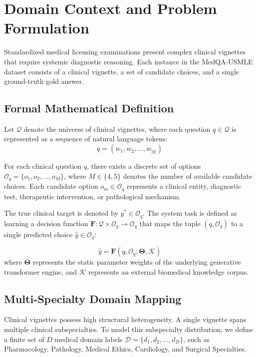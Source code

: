\section{Domain Context and Problem Formulation}
\label{sec:problem_formulation}

Standardized medical licensing examinations present complex clinical vignettes that require systemic diagnostic reasoning. Each instance in the MedQA-USMLE dataset consists of a clinical vignette, a set of candidate choices, and a single ground-truth gold answer.

\subsection{Formal Mathematical Definition}

Let $\mathcal{Q}$ denote the universe of clinical vignettes, where each question $q \in \mathcal{Q}$ is represented as a sequence of natural language tokens:
\begin{equation}
    q = (w_1, w_2, \dots, w_{|q|})
\end{equation}

For each clinical question $q$, there exists a discrete set of options $\mathcal{O}_q = \{o_1, o_2, \dots, o_M\}$, where $M \in \{4, 5\}$ denotes the number of available candidate choices. Each candidate option $o_m \in \mathcal{O}_q$ represents a clinical entity, diagnostic test, therapeutic intervention, or pathological mechanism.

The true clinical target is denoted by $y^* \in \mathcal{O}_q$. The system task is defined as learning a decision function $\mathbf{F}: \mathcal{Q} \times \mathcal{O}_q \to \mathcal{O}_q$ that maps the tuple $(q, \mathcal{O}_q)$ to a single predicted choice $\hat{y} \in \mathcal{O}_q$:

\begin{equation}
    \hat{y} = \mathbf{F}(q, \mathcal{O}_q; \mathbf{\Theta}, \mathcal{K})
\end{equation}
where $\mathbf{\Theta}$ represents the static parameter weights of the underlying generative transformer engine, and $\mathcal{K}$ represents an external biomedical knowledge corpus.

\subsection{Multi-Specialty Domain Mapping}

Clinical vignettes possess high structural heterogeneity. A single vignette spans multiple clinical subspecialties. To model this subspecialty distribution, we define a finite set of $D$ medical domain labels $\mathcal{D} = \{d_1, d_2, \dots, d_D\}$, such as Pharmacology, Pathology, Medical Ethics, Cardiology, and Surgical Specialties.

